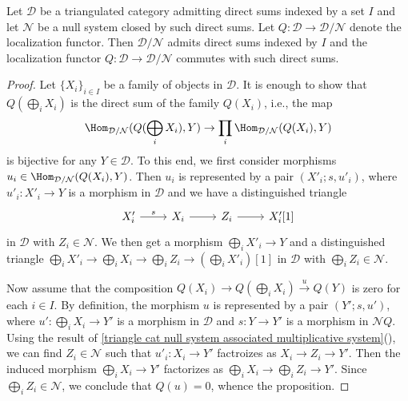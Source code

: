 \begin{proposition}\label{triangle cat localization and direct sum}
Let $\mathcal{D}$ be a triangulated category admitting direct sums indexed by a set $I$ and let $\mathcal{N}$ be a null system closed by such direct sums. Let $Q:\mathcal{D}\to\mathcal{D}/\mathcal{N}$ denote the localization functor. Then $\mathcal{D}/\mathcal{N}$ admits direct sums indexed by $I$ and the localization functor $Q:\mathcal{D} \to\mathcal{D}/\mathcal{N}$ commutes with such direct sums.
\end{proposition}
\begin{proof}
Let $\{X_i\}_{i\in I}$ be a family of objects in $\mathcal{D}$. It is enough to show that $Q(\bigoplus_iX_i)$ is the direct sum of the family $Q(X_i)$, i.e., the map
\[\Hom_{\mathcal{D}/\mathcal{N}}(Q(\bigoplus_iX_i),Y)\to\prod_i\Hom_{\mathcal{D}/\mathcal{N}}(Q(X_i),Y)\]
is bijective for any $Y\in\mathcal{D}$. To this end, we first consider morphisms $u_i\in\Hom_{\mathcal{D}/\mathcal{N}}(Q(X_i),Y)$. Then $u_i$ is represented by a pair $(X'_i;s,u'_i)$, where $u'_i:X'_i\to Y$ is a morphism in $\mathcal{D}$ and we have a distinguished triangle
\[\begin{tikzcd}
X'_i\ar[r,"s"]&X_i\ar[r]&Z_i\ar[r]&X'_i[1]
\end{tikzcd}\]
in $\mathcal{D}$ with $Z_i\in\mathcal{N}$. We then get a morphism $\bigoplus_iX'_i\to Y$ and a distinguished triangle $\bigoplus_iX'_i\to\bigoplus_iX_i\to\bigoplus_iZ_i\to (\bigoplus_iX'_i)[1]$ in $\mathcal{D}$ with $\bigoplus_iZ_i\in\mathcal{N}$.\par
Now assume that the composition $Q(X_i)\to Q(\bigoplus_iX_i)\stackrel{u}{\to} Q(Y)$ is zero for each $i\in I$. By definition, the morphism $u$ is represented by a pair $(Y';s,u')$, where $u':\bigoplus_iX_i\to Y'$ is a morphism in $\mathcal{D}$ and $s:Y\to Y'$ is a morphism in $\mathcal{N}Q$. Using the result of \cref{triangle cat null system associated multiplicative system}(), we can find $Z_i\in\mathcal{N}$ such that $u'_i:X_i\to Y'$ factroizes as $X_i\to Z_i\to Y'$. Then the induced morphism $\bigoplus_iX_i\to Y'$ factorizes as $\bigoplus_iX_i\to\bigoplus_iZ_i\to Y'$. Since $\bigoplus_iZ_i\in\mathcal{N}$, we conclude that $Q(u)=0$, whence the proposition.
\end{proof}

